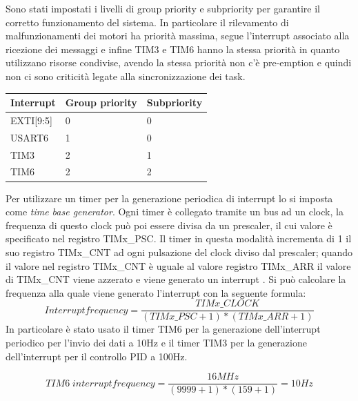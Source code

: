 Sono stati impostati i livelli di group priority e subpriority per garantire il corretto funzionamento del sistema. In particolare il rilevamento di malfunzionamenti dei motori ha priorità massima, segue l'interrupt associato alla ricezione dei messaggi e infine TIM3 e TIM6 hanno la stessa priorità in quanto utilizzano risorse condivise, avendo la stessa priorità non c'è pre-emption e quindi non ci sono criticità legate alla sincronizzazione dei task.

\begin{table}[H]
\centering
\begin{tabular}{lll}
\hline
\textbf{Interrupt} & \textbf{Group priority} & \textbf{Subpriority} \\ \hline
EXTI[9:5]          & 0                       & 0                    \\ \hline
USART6             & 1                       & 0                    \\ \hline
TIM3               & 2                       & 1                    \\ \hline
TIM6               & 2                       & 2                    \\ \hline
\end{tabular}
\end{table}

Per utilizzare un timer per la generazione periodica di interrupt lo si imposta come \textit{time base generator}. Ogni timer è collegato tramite un bus ad un clock, la frequenza di questo clock può poi essere divisa da un prescaler, il cui valore è specificato nel registro TIMx\_PSC. Il timer in questa modalità incrementa di 1 il suo registro TIMx\_CNT ad ogni pulsazione del clock diviso dal prescaler; quando il valore nel registro TIMx\_CNT è uguale al valore registro TIMx\_ARR il valore di TIMx\_CNT viene azzerato e viene generato un interrupt \cite{STM32_timer_cookbook}.
Si può calcolare la frequenza alla quale viene generato l'interrupt con la seguente formula:
\begin{displaymath}
Interrupt frequency = \frac{TIMx\_CLOCK}{(TIMx\_PSC + 1)*(TIMx\_ARR + 1)}
\end{displaymath}
In particolare è stato usato il timer TIM6 per la generazione dell'interrupt periodico per l'invio dei dati a 10Hz e il timer TIM3 per la generazione dell'interrupt per il controllo PID a 100Hz.

\begin{displaymath}
TIM6 \; interrupt frequency = \frac{16 MHz}{(9999 + 1)*(159 + 1)} = 10 Hz
\end{displaymath}

